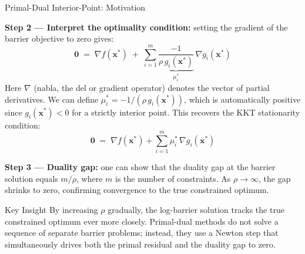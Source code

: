 \documentclass[aspectratio=169,10pt]{beamer}
\newcommand{\bx}{\mathbf{x}}
\newcommand{\grad}{\nabla}
\begin{document}
\begin{frame}[allowframebreaks]{Primal-Dual Interior-Point: Motivation}
  \framebreak

  \textbf{Step 2 --- Interpret the optimality condition:}
  setting the gradient of the barrier objective to zero gives:
  \[
    \mathbf{0} \;=\; \grad f(\bx^*) \;+\;
    \sum_{i=1}^m \underbrace{\frac{-1}{\rho\, g_i(\bx^*)}}_{\mu_i^*}\,
    \grad g_i(\bx^*)
  \]
  Here $\grad$ (nabla, the del or gradient operator) denotes the vector of
  partial derivatives.  We can define $\mu_i^* = -1/(\rho\, g_i(\bx^*))$,
  which is automatically positive since $g_i(\bx^*) < 0$ for a strictly
  interior point.  This recovers the KKT stationarity condition:
  \[
    \mathbf{0} \;=\; \grad f(\bx^*) + \sum_{i=1}^m \mu_i^*\, \grad g_i(\bx^*)
  \]

  \textbf{Step 3 --- Duality gap:}
  one can show that the duality gap at the barrier solution equals
  $m/\rho$, where $m$ is the number of constraints.  As $\rho \to \infty$,
  the gap shrinks to zero, confirming convergence to the true constrained
  optimum.

  \begin{alertblock}{Key Insight}
    By increasing $\rho$ gradually, the log-barrier solution tracks the true
    constrained optimum ever more closely.  Primal-dual methods do not solve
    a sequence of separate barrier problems; instead, they use a Newton step
    that simultaneously drives both the primal residual and the duality gap
    to zero.
  \end{alertblock}

\end{frame}
\end{document}
